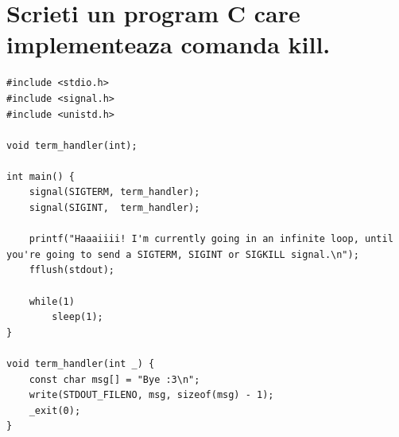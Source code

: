 \documentclass[11pt]{article}
\begin{document}
\section{Scrieti un program C care implementeaza comanda kill.}
\label{sec:orgb76eac7}
\begin{verbatim}
#include <stdio.h>
#include <signal.h>
#include <unistd.h>

void term_handler(int);

int main() {
    signal(SIGTERM, term_handler);
    signal(SIGINT,  term_handler);

    printf("Haaaiiii! I'm currently going in an infinite loop, until you're going to send a SIGTERM, SIGINT or SIGKILL signal.\n");
    fflush(stdout);

    while(1)
        sleep(1);
}

void term_handler(int _) {
    const char msg[] = "Bye :3\n";
    write(STDOUT_FILENO, msg, sizeof(msg) - 1);
    _exit(0);
}
\end{verbatim}
\end{document}
